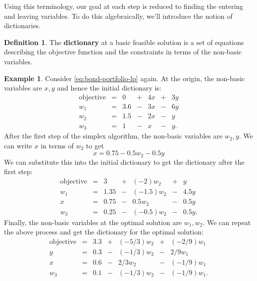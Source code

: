 \documentclass[
]{book}
\theoremstyle{definition}
\newtheorem{definition}{Definition}[chapter]
\theoremstyle{definition}
\newtheorem{example}{Example}[chapter]
\theoremstyle{definition}
\theoremstyle{definition}
\theoremstyle{remark}
\begin{document}
Using this terminology, our goal at each step is reduced to finding the entering and leaving variables.
To do this algebraically, we'll introduce the notion of dictionaries.

\begin{definition}
The \textbf{dictionary} at a basic feasible solution is a set of equations describing the objective function and the constraints in terms of the non-basic variables.
\end{definition}

\begin{example}
\protect\hypertarget{exm:dictionaries}{}\label{exm:dictionaries}Consider \eqref{eq:bond-portfolio-lp} again. At the origin, the non-basic variables are \(x, y\) and hence the initial dictionary is:
\begin{equation}
  \begin{array}{rlrrrrr}
  \mbox{objective} & = & 0 & + & 4x & + & 3y \\
  w_1 & = & 3.6 & - & 3x & - & 6y \\
  w_2 & = & 1.5 & - & 2x & - & y \\
  w_3 & = & 1 & - & x & - & y.
  \end{array}
  \label{eq:example-dictionary-1}
\end{equation}
After the first step of the simplex algorithm, the non-basic variables are \(w_2, y\). We can write \(x\) in terms of \(w_2\) to get
\begin{equation*}
  x = 0.75 - 0.5 w_2 - 0.5 y
\end{equation*}
We can substitute this into the initial dictionary to get the dictionary after the first step:
\begin{equation}
  \begin{array}{rlrrrrr}
  \mbox{objective} & = & 3 & + & (-2)w_2 & + & y \\
  w_1 & = & 1.35 & - & (-1.5) w_2 & - & 4.5y \\
  x & = & 0.75 & - & 0.5 w_2 & - & 0.5y \\
  w_3 & = & 0.25 & - & (-0.5) w_2 & - & 0.5y.
  \end{array}
  \label{eq:example-dictionary-2}
\end{equation}
Finally, the non-basic variables at the optimal solution are \(w_1, w_2\).
We can repeat the above process and get the dictionary for the optimal solution:
\begin{equation}
  \begin{array}{rlrrrrr}
  \mbox{objective} & = & 3.3 & + & (-5/3)w_2 & + & (-2/9)w_1 \\
  y & = & 0.3 & - & (-1/3) w_2 & - & 2/9 w_1 \\
  x & = & 0.6 & - & 2/3 w_2 & - & (-1/9) w_1 \\
  w_3 & = & 0.1 & - & (-1/3) w_2 & - & (-1/9) w_1.
  \end{array}
  \label{eq:example-dictionary-3}
\end{equation}
\end{example}
\end{document}
